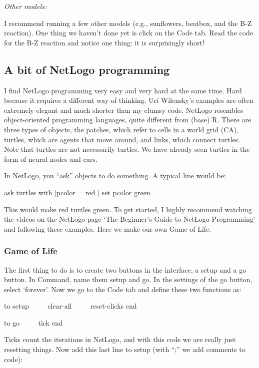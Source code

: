 \documentclass[
  a4paper,
  DIV=11,
  numbers=noendperiod]{scrreprt}
\begin{document}
\emph{Other models:}

I recommend running a few other models (e.g., sunflowers, beatbox, and
the B-Z reaction). One thing we haven't done yet is click on the Code
tab. Read the code for the B-Z reaction and notice one thing: it is
surprisingly short!

\hypertarget{sec-A-bit-of-NetLogo-programming}{%
\subsection{A bit of NetLogo
programming}\label{sec-A-bit-of-NetLogo-programming}}

I find NetLogo programming very easy and very hard at the same time.
Hard because it requires a different way of thinking. Uri Wilensky's
examples are often extremely elegant and much shorter than my clumsy
code. NetLogo resembles object-oriented programming languages, quite
different from (base) R. There are three types of objects, the patches,
which refer to cells in a world grid (CA), turtles, which are agents
that move around, and links, which connect turtles. Note that turtles
are not necessarily turtles. We have already seen turtles in the form of
neural nodes and cars.

In NetLogo, you ``ask'' objects to do something. A typical line would
be:

{ask} {turtles with} {{[}}{pcolor =} {red} {]} {set} {pcolor} {green}

This would make red turtles green. To get started, I highly recommend
watching the videos on the NetLogo page `The Beginner's Guide to NetLogo
Programming' and following these examples. Here we make our own Game of
Life.

\hypertarget{sec-Game-of-Life}{%
\subsubsection{Game of Life}\label{sec-Game-of-Life}}

The first thing to do is to create two buttons in the interface, a setup
and a go button. In Command, name them setup and go. In the settings of
the go button, select `forever'. Now we go to the Code tab and define
these two functions as:

{to} {setup} ~~~~ {clear-all} ~~~~ {reset-clicks} {end}

{to} {go} ~~~~ {tick} {end}

Ticks count the iterations in NetLogo, and with this code we are really
just resetting things. Now add this last line to setup (with ``;'' we
add comments to code):
\end{document}
